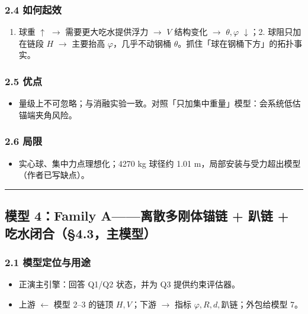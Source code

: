 \documentclass[UTF8,a4paper,zihao=-4]{ctexart}
\begin{document}
\subsubsection{\texorpdfstring{2.4 如何起效}{2.4 如何起效}}
\begin{enumerate}[leftmargin=1.8em]
\item 球重 $\uparrow$ $\rightarrow$ 需要更大吃水提供浮力 $\rightarrow$ \(V\) 结构变化 $\rightarrow$ \(\theta,\varphi\) $\downarrow$；2. 球阻只加在链段 \(H\) $\rightarrow$ 主要抬高 \(\varphi\)，几乎不动钢桶 \(\theta\)。抓住「球在钢桶下方」的拓扑事实。
\end{enumerate}

\subsubsection{\texorpdfstring{2.5 优点}{2.5 优点}}
\begin{itemize}[leftmargin=1.5em]
\item 量级上不可忽略；与消融实验一致。对照「只加集中重量」模型：会系统低估锚端夹角风险。
\end{itemize}

\subsubsection{\texorpdfstring{2.6 局限}{2.6 局限}}
\begin{itemize}[leftmargin=1.5em]
\item 实心球、集中力点理想化；4270 kg 球径约 1.01 m，局部安装与受力超出模型（作者已写缺点）。
\end{itemize}

\vspace{0.4em}\hrule\vspace{0.4em}

\subsection{\texorpdfstring{模型 4：Family A------离散多刚体锚链 + 趴链 + 吃水闭合（§4.3，主模型）}{模型 4：Family A------离散多刚体锚链 + 趴链 + 吃水闭合（§4.3，主模型）}}

\subsubsection{\texorpdfstring{2.1 模型定位与用途}{2.1 模型定位与用途}}
\begin{itemize}[leftmargin=1.5em]
\item 正演主引擎：回答 Q1/Q2 状态，并为 Q3 提供约束评估器。
\item 上游 $\leftarrow$ 模型 2--3 的链顶 \(H,V\)；下游 $\rightarrow$ 指标 \(\varphi,R,d,\)趴链；外包给模型 7。
\end{itemize}
\end{document}
